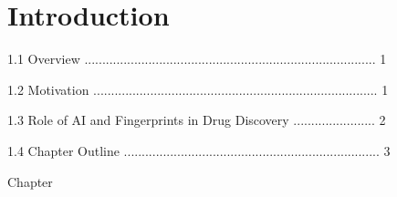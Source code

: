 \chapter{Introduction}
1.1 Overview .................................................................................. 1 

1.2 Motivation ................................................................................ 1 

1.3 Role of AI and Fingerprints in Drug Discovery ....................... 2 

1.4 Chapter Outline ........................................................................ 3 

Chapter